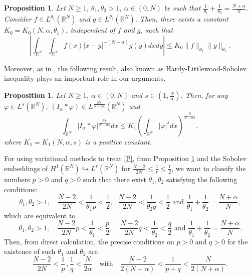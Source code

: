 \documentclass[12pt,a4paper]{article}
\newtheorem{proposition}[theorem]{Proposition}
\numberwithin{equation}{section}
\begin{document}
\begin{proposition}\label{t1}
Let $N\geq1$, $\theta_1, \theta_2 > 1$, $\alpha\in(0,N)$ be such that $\frac{1}{\theta_1} + \frac{1}{\theta_2} = \frac{N+\alpha}{N}$. Consider $f\in L^{\theta_1}(\mathbb{R}^N)$ and $g \in L^{\theta_2}(\mathbb{R}^N)$. Then, there exists a constant $K_0=K_0(N, \alpha, \theta_1)$, independent of $f$ and $g$, such that
\begin{equation}\label{HLS1} \tag{HLS1}
\left| \int_{\mathbb{R}^N} \int_{\mathbb{R}^N} f(x)|x-y|^{-(N-\alpha)}g(y) dx dy \right| \leq K_0 \|f\|_{\theta_1} \|g\|_{\theta_2}.
\end{equation} 
\end{proposition}

Moreover, as in \cite[eq. (1.3)]{Moroz2013}, the following result, also known as Hardy-Littlewood-Sobolev inequality plays an important role in our arguments.  

\begin{proposition}\label{t2} 
Let $N\geq 1$, $\alpha\in (0, N)$ and $s\in \left(1, \frac{N}{\alpha}\right)$. Then, for any $\varphi \in L^{s}(\mathbb{R}^N)$, $(I_\alpha \ast \varphi) \in L^{\frac{Ns}{N-\alpha s}}(\mathbb{R}^N)$ and
\begin{equation}\label{HLS2} \tag{HLS2}
\int_{\mathbb{R}^N} |I_\alpha \ast \varphi|^{\frac{Ns}{N-\alpha s}} dx \leq K_1 \left(\int_{\mathbb{R}^N}  |\varphi|^s dx \right)^{\frac{N}{N-\alpha s}},
\end{equation}
where $K_1=K_1(N, \alpha, s)$ is a positive constant.
\end{proposition}

For using variational methods to treat \eqref{P}, from Proposition \ref{t1} and the Sobolev embeddings of $H^1(\mathbb{R}^N) \hookrightarrow L^{r}(\mathbb{R}^N)$ for $\frac{N-2}{2N}\leq \frac{1}{r} \leq \frac{1}{2}$, we want to classify the numbers $p>0$ and $q>0$ such that there exist $\theta_1 , \theta_2$ satisfying the following conditions:
\begin{equation}\label{novaeq}
\theta_1, \theta_2 >1, \quad \dfrac{N-2}{2N} < \frac{1}{\theta_1 p} < \frac{1}{2}, \ \ \ \dfrac{N-2}{2N} < \frac{1}{\theta_2 q} < \frac{1}{2} \mbox{ \ \ \ and \ \ \ } \dfrac{1}{\theta_1}+\dfrac{1}{\theta_2}=\dfrac{N+\alpha}{N}, 
\end{equation}
which are equivalent to
\[
\theta_1, \theta_2 >1, \quad \frac{N-2}{2N}p < \frac{1}{\theta_1} < \frac{p}{2}, \quad \frac{N-2}{2N}q < \frac{1}{\theta_2} < \frac{q}{2} \mbox{ \ \ \ and \ \ \ } \dfrac{1}{\theta_1}+\dfrac{1}{\theta_2}=\dfrac{N+\alpha}{N}.
\]
Then, from direct calculation, the precise conditions on $p>0$ and $q>0$ for the existence of such $\theta_1$ and $\theta_2$ are
\begin{equation}\label{H2}
\tag{H2}
\frac{N-2}{2N} < \frac{1}{p}\, , \frac{1}{q} < \frac{N}{2\alpha} \quad \text{with} \quad \dfrac{N-2}{2(N+\alpha)} < \dfrac{1}{p+q} < \dfrac{N}{2(N+\alpha)}.  
\end{equation}
\end{document}
